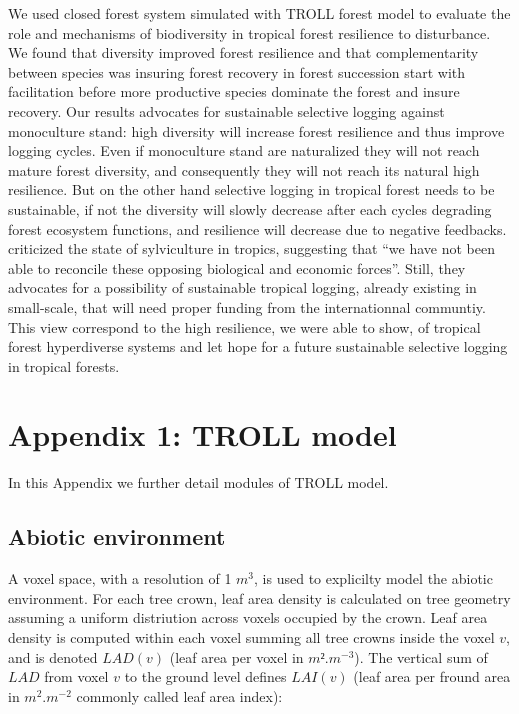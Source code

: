 \documentclass[12pt,]{article}
\let\oldsection\section
\renewcommand\section{\newpage\oldsection}
\theoremstyle{definition}
\theoremstyle{definition}
\theoremstyle{remark}
\begin{document}
We used closed forest system simulated with TROLL forest model to
evaluate the role and mechanisms of biodiversity in tropical forest
resilience to disturbance. We found that diversity improved forest
resilience and that complementarity between species was insuring forest
recovery in forest succession start with facilitation before more
productive species dominate the forest and insure recovery. Our results
advocates for sustainable selective logging against monoculture stand:
high diversity will increase forest resilience and thus improve logging
cycles. Even if monoculture stand are naturalized they will not reach
mature forest diversity, and consequently they will not reach its
natural high resilience. But on the other hand selective logging in
tropical forest needs to be sustainable, if not the diversity will
slowly decrease after each cycles degrading forest ecosystem functions,
and resilience will decrease due to negative feedbacks.
\citet{Zimmerman2012} criticized the state of sylviculture in tropics,
suggesting that ``we have not been able to reconcile these opposing
biological and economic forces''. Still, they advocates for a
possibility of sustainable tropical logging, already existing in
small-scale, that will need proper funding from the internationnal
communtiy. This view correspond to the high resilience, we were able to
show, of tropical forest hyperdiverse systems and let hope for a future
sustainable selective logging in tropical forests.

\appendix


\hypertarget{appendix-1-troll-model}{\section{Appendix 1: TROLL
model}\label{appendix-1-troll-model}}

In this Appendix we further detail modules of TROLL model.

\subsection{Abiotic environment}\label{abiotic-environment}

A voxel space, with a resolution of 1 \(m^3\), is used to explicilty
model the abiotic environment. For each tree crown, leaf area density is
calculated on tree geometry assuming a uniform distriution across voxels
occupied by the crown. Leaf area density is computed within each voxel
summing all tree crowns inside the voxel \(v\), and is denoted
\(LAD(v)\) (leaf area per voxel in \(m².m^{-3}\)). The vertical sum of
\(LAD\) from voxel \(v\) to the ground level defines \(LAI(v)\) (leaf
area per fround area in \(m^2.m^{-2}\) commonly called leaf area index):
\end{document}

